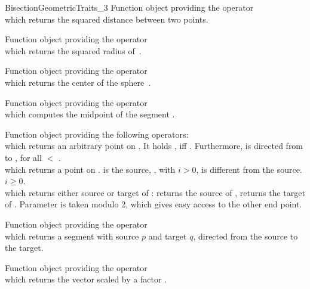 \begin{ccRefConcept}{BisectionGeometricTraits_3}
{Function object providing the operator\\
 which returns the squared distance
between two points.}

{Function object providing the operator\\
 which returns the squared radius
of~.}

{Function object providing the operator\\
 which returns the center of
the sphere~.}

{Function object providing the operator\\
 which computes
the midpoint of the segment .}

{Function object providing the following operators:\\
   which returns an
  arbitrary point on . It holds , iff
  . Furthermore, is directed from  to
  , for all  $<$ .\\
   which returns a point on
  .  is the source, , with
  $i>0$, is different from the source. \ccPrecond $i \geq 0$.\\
   which returns either source
  or target of :  returns the source of ,
   returns the target of . Parameter
   is taken modulo 2, which gives easy access to the other end
  point.
}

{Function object providing the operator\\
   which
  returns a segment with source $p$ and target $q$, directed from the
  source to the target.}

{Function object providing the operator\\
 which returns
the vector  scaled by a factor .}


\end{ccRefConcept}
